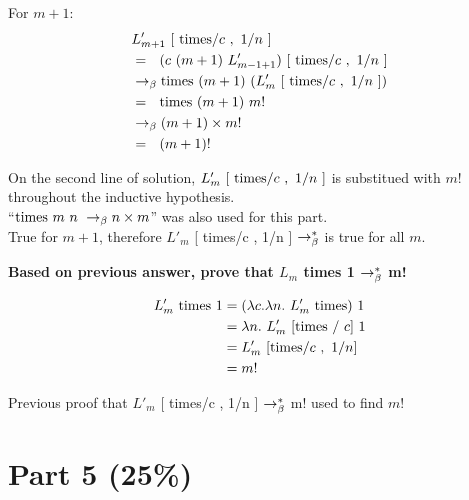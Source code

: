 \documentclass{article}
\begin{document}
\begin{Large}
		For $m+1$:
		\begin{align*}
			&L_{m+1}^\prime \ [\ \tim / c \ , \ 1/n \ ] \\
			&= \saq (c \ (m+1) \ L_{m-1+1}^\prime ) \ [\ \tim / c \ , \ 1/n \ ] \\
			&\equals \tim \ (m+1) \ ( L_m^\prime \ [\ \tim / c \ , \ 1/n \ ]) \\
			&= \saq \tim \ (m+1) \ m! \\
			&\equals (m+1) \times  m! \\
			&= \saq (m+1)!
		\end{align*}
		
		On the second line of solution, $L_m^\prime \ [\ \text{times} / c \ , \ 1/n \ ]$ is substitued with $m!$ throughout the inductive hypothesis. \\
		
		``$\text{times} \ m \ n \ \rightarrow_\beta n \times m$'' was also used for this part. \\
		
		True for $m+1$, therefore $L'_m$ [ times/c , 1/n ] $\rightarrow_\beta^*$ is true for all $m$. \\
		\newline
		
		\textbf{Based on previous answer, prove that $L_m$ times 1  $\rightarrow_\beta^*$ m!}
		
		\begin{align*}
			L_m^\prime \ \tim \ 1 &= (\la c.\la n. \ L_m^\prime \ \tim) \ 1 \\
			&= \la n. \ L_m^\prime \ [\tim \ / \ c] \ 1 \\
			&= L_m^\prime \ [\tim /c \ , \ 1/n] \\
			&= m!
		\end{align*}
		
		Previous proof that $L'_m$ [ times/c , 1/n ] $\rightarrow_\beta^*$  m! used to find $m!$
	\end{Large}
	\newpage
	
	
	
	\section{Part 5 (25\%)}
	
\end{document}
